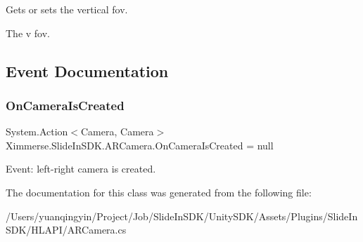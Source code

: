 Gets or sets the vertical fov. 

The v fov.

\subsection{Event Documentation}
\mbox{\label{class_ximmerse_1_1_slide_in_s_d_k_1_1_a_r_camera_a5b56624a86763a503902cf9bba98da01}} 
\subsubsection{\texorpdfstring{On\+Camera\+Is\+Created}{OnCameraIsCreated}}
{\footnotesize\ttfamily System.\+Action$<$Camera, Camera$>$ Ximmerse.\+Slide\+In\+S\+D\+K.\+A\+R\+Camera.\+On\+Camera\+Is\+Created = null\hspace{0.3cm}{\ttfamily [static]}}



Event\+: left-\/right camera is created. 



The documentation for this class was generated from the following file\+:\begin{DoxyCompactItemize}
\item 
/\+Users/yuanqingyin/\+Project/\+Job/\+Slide\+In\+S\+D\+K/\+Unity\+S\+D\+K/\+Assets/\+Plugins/\+Slide\+In\+S\+D\+K/\+H\+L\+A\+P\+I/A\+R\+Camera.\+cs\end{DoxyCompactItemize}
